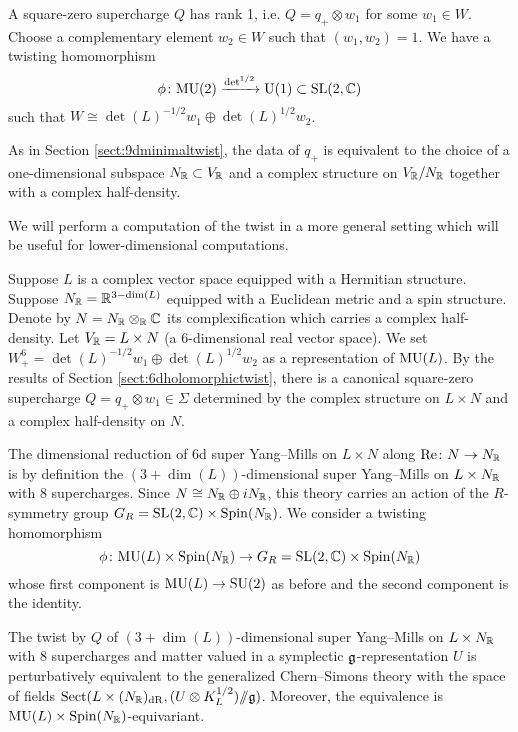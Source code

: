 \documentclass[10pt, oneside]{article}
\begin{document}
A square-zero supercharge $Q$ has rank 1, i.e. $Q=q_+\otimes w_1$ for some $w_1\in W$. Choose a complementary element $w_2\in W$ such that $(w_1, w_2) = 1$. We have a twisting homomorphism
\[\phi\colon\mathrm{MU}(2)\xrightarrow{\det^{1/2}}\mathrm{U}(1)\subset \mathrm{SL}(2, \mathbb C)\]
such that $W\cong \det(L)^{-1/2} w_1\oplus \det(L)^{1/2} w_2$.

As in Section \ref{sect:9dminimaltwist}, the data of $q_+$ is equivalent to the choice of a one-dimensional subspace $N_\mathbb R\subset V_\mathbb R$ and a complex structure on $V_\mathbb R/N_\mathbb R$ together with a complex half-density.

We will perform a computation of the twist in a more general setting which will be useful for lower-dimensional computations.

Suppose $L$ is a complex vector space equipped with a Hermitian structure. Suppose $N_\mathbb R=\mathbb R^{3-\dim(L)}$ equipped with a Euclidean metric and a spin structure. Denote by $N=N_\mathbb R\otimes_\mathbb R\mathbb C$ its complexification which carries a complex half-density. Let $V_\mathbb R=L\times N$ (a 6-dimensional real vector space). We set $W^6_+=\det(L)^{-1/2}w_1\oplus \det(L)^{1/2} w_2$ as a representation of $\mathrm{MU}(L)$. By the results of Section \ref{sect:6dholomorphictwist}, there is a canonical square-zero supercharge $Q=q_+\otimes w_1\in\Sigma$ determined by the complex structure on $L\times N$ and a complex half-density on $N$.

The dimensional reduction of 6d super Yang--Mills on $L\times N$ along $\mathrm{Re}\colon N\rightarrow N_\mathbb R$ is by definition the $(3+\dim(L))$-dimensional super Yang--Mills on $L\times N_\mathbb R$ with 8 supercharges. Since $N\cong N_\mathbb R\oplus iN_\mathbb R$, this theory carries an action of the $R$-symmetry group $G_R=\mathrm{SL}(2, \mathbb C)\times \mathrm{Spin}(N_\mathbb R)$. We consider a twisting homomorphism
\[\phi\colon \mathrm{MU}(L)\times \mathrm{Spin}(N_\mathbb R)\rightarrow G_R=\mathrm{SL}(2, \mathbb C)\times \mathrm{Spin}(N_\mathbb R)\]
whose first component is $\mathrm{MU}(L)\rightarrow \mathrm{SU}(2)$ as before and the second component is the identity.

\begin{theorem}
The twist by $Q$ of $(3+\dim(L))$-dimensional super Yang--Mills on $L\times N_\mathbb R$ with 8 supercharges and matter valued in a symplectic $\mathfrak g$-representation $U$ is perturbatively equivalent to the generalized Chern--Simons theory with the space of fields $\mathrm{Sect}(L\times (N_\mathbb R)_{\mathrm{dR}}, (U\otimes K_L^{1/2})/\!\!/ \mathfrak g)$. Moreover, the equivalence is $\mathrm{MU}(L)\times \mathrm{Spin}(N_\mathbb R)$-equivariant.
\label{thm:6dCSreduction}
\end{theorem}
\end{document}
